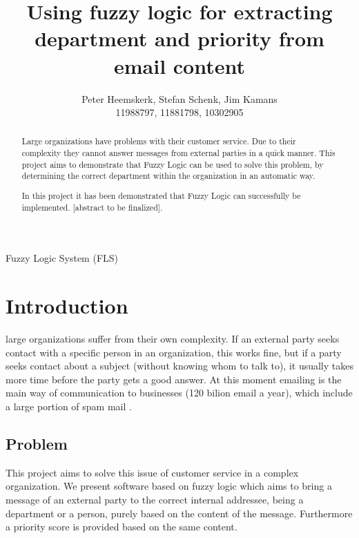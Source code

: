 \documentclass[journal]{IEEEtran}
\begin{document}
\title{Using fuzzy logic for extracting department and priority from email content}
\author{Peter Heemskerk, Stefan Schenk, Jim Kamans\\11988797, 11881798, 10302905}


\maketitle

\begin{abstract}
Large organizations have problems with their customer service. Due to their complexity they cannot answer messages from external parties in a quick manner. This project aims to demonstrate that Fuzzy Logic can be used to solve this problem, by determining the correct department within the organization in an automatic way.

In this project it has been demonstrated that Fuzzy Logic can successfully be implemented. [abstract to be finalized].
\end{abstract}

\begin{IEEEkeywords}
Fuzzy Logic System (FLS)
\end{IEEEkeywords}

\section{Introduction}
 large organizations suffer from their own complexity. If an external party seeks contact with a specific person in an organization, this works fine, but if a party seeks contact about a subject (without knowing whom to talk to), it usually takes more time before the party gets a good answer. At this moment emailing is the main way of communication to businesses (120 bilion email a year), which include a large portion of spam mail \cite{email_statistics}.\\

\subsection{Problem}

This project aims to solve this issue of customer service in a complex organization. We present software based on fuzzy logic which aims to bring a message of an external party to the correct internal addressee, being a department or a person, purely based on the content of the message. Furthermore a priority score is provided based on the same content.
\end{document}
